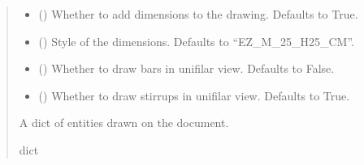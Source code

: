 \documentclass[a4paper,10pt,english]{sphinxmanual}
\begin{document}
\begin{fulllineitems}
\begin{fulllineitems}
\begin{quote}
\begin{description}
\begin{itemize}
\item {} 
\sphinxAtStartPar
{} () \textendash{} Whether to add dimensions to the drawing. Defaults to True.

\item {} 
\sphinxAtStartPar
{} () \textendash{} Style of the dimensions. Defaults to “EZ\_M\_25\_H25\_CM”.

\item {} 
\sphinxAtStartPar
{} () \textendash{} Whether to draw bars in unifilar view. Defaults to False.

\item {} 
\sphinxAtStartPar
{} () \textendash{} Whether to draw stirrups in unifilar view. Defaults to True.

\end{itemize}

\sphinxAtStartPar
A dict of entities drawn on the document.

\sphinxAtStartPar
dict

\end{description}\end{quote}

\end{fulllineitems}



\end{fulllineitems}
\end{document}
